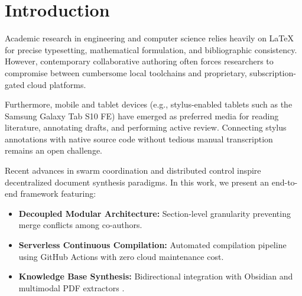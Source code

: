 \section{Introduction}
\label{sec:intro}

Academic research in engineering and computer science relies heavily on \LaTeX{} for precise typesetting, mathematical formulation, and bibliographic consistency. However, contemporary collaborative authoring often forces researchers to compromise between cumbersome local toolchains and proprietary, subscription-gated cloud platforms.

Furthermore, mobile and tablet devices (e.g., stylus-enabled tablets such as the Samsung Galaxy Tab S10 FE) have emerged as preferred media for reading literature, annotating drafts, and performing active review. Connecting stylus annotations with native source code without tedious manual transcription remains an open challenge.

Recent advances in swarm coordination and distributed control \cite{Alqudsi2025UavSwarms} inspire decentralized document synthesis paradigms. In this work, we present an end-to-end framework featuring:
\begin{itemize}
    \item \textbf{Decoupled Modular Architecture:} Section-level granularity preventing merge conflicts among co-authors.
    \item \textbf{Serverless Continuous Compilation:} Automated compilation pipeline using GitHub Actions with zero cloud maintenance cost.
    \item \textbf{Knowledge Base Synthesis:} Bidirectional integration with Obsidian and multimodal PDF extractors \cite{Docling2024IBM}.
\end{itemize}
